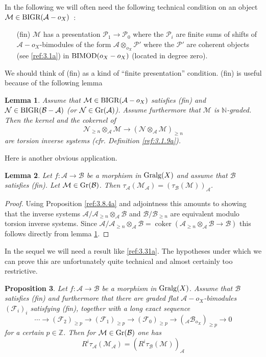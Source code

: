 \documentclass{amsproc}
\def \ZZ{{\mathbb Z}}
\def \NN{{\mathbb N}}
\def\Ascr{{\mathcal A}}
\def\Bscr{{\mathcal B}}
\def\Fscr{{\mathcal F}}
\def\Mscr{{\mathcal M}}
\def\Nscr{{\mathcal N}}
\def\Pscr{{\mathcal P}}
\def\BIMOD{\mathop{\text{BIMOD}}}
\def\Gr{\mathop{\text{Gr}}}
\def\BIGR{\mathop{\text{BIGR}}}
\def\Gralg{\mathop{\text{Gralg}}}
\def\coker{\operatorname {coker}}
\def\r{\rightarrow}
\let\oldtext\text
\def\text#1{\oldtext{\upshape #1}}
\newtheorem{lemmas}{Lemma}[subsection]
\newtheorem{propositions}[lemmas]{Proposition}
\theoremstyle{definition}
\theoremstyle{remark}
\numberwithin{equation}{section}
\numberwithin{table}{section}
\numberwithin{figure}{section}
\def\Gr{\mathop{\text{Gr}}}
\begin{document}
In the following we will often need the following technical condition
on an object $\Mscr\in\BIGR(\Ascr-o_X)$~:
\begin{itemize}
\item[(fin)] $\Mscr$ has a presentation $\Pscr_1\r \Pscr_0$ where the
  $\Pscr_i$ are finite sums of shifts of $\Ascr-o_X$-bimodules of the
  form $\Ascr\otimes_{o_X}\Pscr'$ where the $\Pscr'$ are coherent
  objects (see \ref{ref:3.1a}) in $\BIMOD(o_X-o_X)$ (located in degree
  zero).
 \end{itemize}
We should think of (fin) as a kind of ``finite presentation''
condition. (fin) is useful because of the following lemma
\begin{lemmas} 
\label{ref:3.9.8a}
Assume that $\Mscr\in\BIGR(\Ascr-o_X)$ satisfies
  (fin) and $\Nscr\in\BIGR(\Bscr-\Ascr)$ (or
  $\Nscr\in\Gr(\Ascr)$). Assume furthermore that $\Mscr$ is
  $\NN$-graded. Then the kernel and the cokernel of 
\[
\Nscr_{\ge n}\otimes_\Ascr \Mscr\r (\Nscr\otimes_\Ascr\Mscr)_{\ge n}
\]
are torsion inverse systems (cfr. Definition \ref{ref:3.1.9a}).
\end{lemmas}
Here is another obvious application.
\begin{lemmas} 
\label{ref:3.9.9a}  Let $f:\Ascr\r \Bscr$ be a morphism  in
$\Gralg(X)$ and assume that $\Bscr$ satisfies (fin). Let $\Mscr\in \Gr(\Bscr)$. Then
$\tau_{\Ascr}(\Mscr_\Ascr)=(\tau_{\Bscr}(\Mscr))_\Ascr$.
\end{lemmas}
\begin{proof}
  Using Proposition \ref{ref:3.8.4a} and adjointness this amounts to
  showing that the inverse systems $\Ascr/\Ascr_{\ge n}\otimes_\Ascr
  \Bscr$ and $\Bscr/\Bscr_{\ge n}$ are equivalent modulo torsion
  inverse systems. Since $\Ascr/\Ascr_{\ge n}\otimes_\Ascr
  \Bscr=\coker (\Ascr_{\ge n}\otimes_\Ascr\Bscr\r \Bscr)$ this follows
  directly from lemma \ref{ref:3.9.8a}.
\end{proof}


In the sequel we will need a result like \eqref{ref:3.31a}. The hypotheses
under which we can prove this are
unfortunately quite technical and almost certainly too restrictive.

\begin{propositions}
\label{ref:3.9.10a}
Let $f:\Ascr\r \Bscr$ be a morphism in $\Gralg(X)$. Assume that
$\Bscr$ satisfies (fin) and furthermore that there are graded flat
$\Ascr-o_X$-bimodules $(\Fscr_i)_i$ satisfying (fin), together with a
long exact sequence
\[
\cdots \r(\Fscr_2)_{\ge p}\r (\Fscr_1)_{\ge p}\r (\Fscr_0)_{\ge p}
\r ({}_\Ascr\Bscr_{o_X})_{\ge p}\r 0
\]
for a certain $p\in\ZZ$. Then for $\Mscr\in\Gr(\Bscr)$ one has
\begin{equation}
\label{ref:3.31a}
R^i\tau_{\Ascr}(\Mscr_\Ascr)=(R^i\tau_{\Bscr}(\Mscr))_\Ascr
\end{equation}
\end{propositions}
\end{document}
